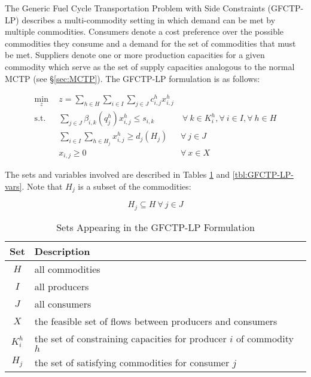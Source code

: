 
The Generic Fuel Cycle Transportation Problem with Side Constraints (GFCTP-LP)
describes a multi-commodity setting in which demand can be met by multiple
commodities. Consumers denote a cost preference over the possible commodities
they consume and a demand for the set of commodities that must be met. Suppliers
denote one or more production capacities for a given commodity which serve as
the set of supply capacities analogous to the normal MCTP
(see \S\ref{sec:MCTP}). The GFCTP-LP formulation is as follows:

\begin{subequations}\label{eqs:GFCTP-LP}
  \begin{align}
    \min_{z} \:\: & 
    z = \sum_{h \in H}\sum_{i \in I}\sum_{j \in J}c_{i,j}^{h} x_{i,j}^{h} 
    & \label{eqs:GFCTP-LP_obj} \\
    \text{s.t.} \:\: &
    \sum_{j \in J}\beta_{i,k}(q_{j}^{h}) x_{i,j}^{h} \leq s_{i,k} 
    &
    \: \forall \: k \in K_{i}^{h},  
    \forall \: i \in I, \forall \: h \in H \label{eqs:GFCTP-LP_sup} \\
    &
    \sum_{i \in I}\sum_{h \in H_{j}} x_{i,j}^{h} \geq d_{j}(H_{j}) 
    & 
    \forall \: j \in J \label{eqs:GFCTP-LP_dem} \\
    &
    x_{i,j} \geq 0
    &
    \forall \: x \in X \label{eqs:GFCTP-LP_x}
  \end{align}
\end{subequations}

The sets and variables involved are described in Tables \ref{tbl:GFCTP-LP-sets}
and \ref{tbl:GFCTP-LP-vars}. Note that $H_{j}$ is a subset of the commodities:

\begin{equation}
  H_{j} \subseteq H \: \forall \: j \in J
\end{equation}

\begin{table} [h!]
\centering
\begin{tabularx}{\columnwidth-10pt}{|c|X|} %
\hline
Set         & Description \\
\hline
$H$         & all commodities  \\
$I$         & all producers  \\
$J$         & all consumers  \\
$X$         & the feasible set of flows between producers and consumers  \\
$K_{i}^{h}$  & the set of constraining capacities for 
            producer $i$ of commodity $h$  \\
$H_{j}$     & the set of satisfying commodities for consumer $j$  \\
\hline
\end{tabularx}
\caption{Sets Appearing in the GFCTP-LP Formulation}
\label{tbl:GFCTP-LP-sets}
\end{table}

